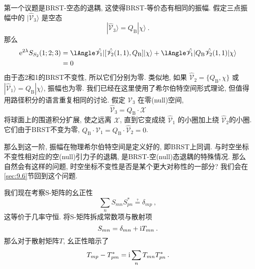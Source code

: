 第一个议题是BRST-空态的退耦, 这使得BRST-等价态有相同的振幅. 假定三点振幅中的 $|\hat{\mathscr{V}}_{3}\rangle$ 是空态
\begin{equation}
	|\hat{\mathscr{V}}_{3}\rangle=Q_{\mathrm{B}}|\chi\rangle \:. \label{9.1.7}
\end{equation}
那么
\begin{align}
	\me^{2 \lambda} S_{S_{2}}(1; 2; 3) 
	&=  \lAngle \hat{\mathscr{V}}_{1} | [\hat{\mathscr{V}}_{2}(1,1), Q_{\mathrm{B}}] |\chi\rangle        
	   +\lAngle \hat{\mathscr{V}}_{1} | Q_{\mathrm{B}} \hat{\mathscr{V}}_{2}(1,1) |\chi\rangle \nonumber \\
	&=0 \label{9.1.8}
\end{align}
由于态2和1的BRST不变性, 所以它们分别为零. 类似地, 如果 $\hat{\mathscr{V}}_{2}= \{Q_{\mathrm{B}}, \chi\}$ 或 
$|\hat{\mathscr{V}}_{1}\rangle= Q_{\mathrm{B}}|\chi\rangle$, 振幅也为零. 我们已经在这里使用了希尔伯特空间形式理论, 
但值得用路径积分的语言重复相同的讨论. 假定 $\mathscr{V}_{3}$ 在零(null)空间,
\begin{equation}
	\hat{\mathscr{V}}_{3}=Q_{\mathrm{B}} \cdot \mathscr{X}
\end{equation}
将球面上的围道积分扩展, 使之远离 $\mathscr{X}$, 直到它变成绕 $\hat{\mathscr{V}}_{1}$ 的小圈加上绕 $\hat{\mathscr{V}}_{2}$的小圈. 
它们由于BRST不变为零, $Q_{\mathrm{B}} \cdot \hat{\mathscr{V}}_{1}=Q_{\mathrm{B}} \cdot \hat{\mathscr{V}}_{2}=0$.

那么到这一阶, 振幅在物理希尔伯特空间是定义好的, 即BRST上同调. 与时空坐标不变性相对应的空(null)引力子的退耦, 是BRST-空(null)态退耦的特殊情况. 
那么自然会有这样的问题, 时空坐标不变性是否是某个更大对称性的一部分? 我们会在\ref{sec:9.6}节回到这个问题. 

我们现在考察S-矩阵的幺正性
\begin{equation}
	\sum_{n} S_{mn} S_{pn}^{*} \questeq \delta_{mp} \:, \label{9.1.10}
\end{equation}
这等价于几率守恒. 将S-矩阵拆成常数项与散射项
\begin{equation}
	S_{mn} = \delta_{mn} + \mathrm{i} T_{mn} \:. \label{9.1.11}
\end{equation}
那么对于散射矩阵$T$, 幺正性暗示了
\begin{equation}
	T_{mp} - T_{pm}^{*} = \mathrm{i} \sum_{n} T_{mn} T_{pn}^{*} \:. \label{9.1.12}
\end{equation}

